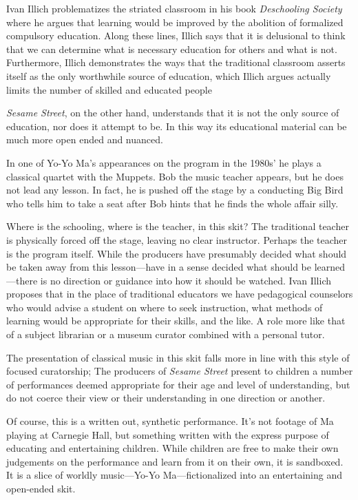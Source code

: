 \documentclass[12pt,letterpaper]{article}
\begin{document}
	Ivan Illich problematizes the striated classroom in his book
	\textit{Deschooling Society} where he argues
	that learning would be improved by the abolition of formalized
	compulsory education. Along these lines, Illich says that it is 
	delusional to think that we can determine what is necessary education 
	for others and what is not.\autocite[12]{Illich} Furthermore, Illich 
	demonstrates the ways that the traditional classroom asserts itself as
	the only worthwhile source of education, which Illich argues actually 
	limits the number of skilled and educated people\autocite[39]{Illich} 
		
	\textit{Sesame Street}, on the other hand, understands that it is not 
	the only source of education, nor does it attempt to be. In this way its
	educational material can be much more open ended and nuanced. 

	In one of Yo-Yo Ma's appearances on the program in the 1980s' he plays
	a classical quartet with the Muppets. Bob the music teacher appears, 
	but he does not lead any lesson. In fact, he is pushed off the stage by 
	a conducting Big Bird who tells him to take a seat after Bob hints that
	he finds the whole affair silly.

	Where is the schooling, where is the teacher, in this skit? The 
	traditional teacher is physically forced off the stage, leaving no clear
	instructor.  Perhaps the teacher is the program itself.  While the 
	producers have presumably decided what should be taken away from this 
	lesson---have in a sense decided what should be learned---there is no 
	direction or guidance into how it should be watched. Ivan Illich
	proposes that in the place of traditional educators we have
	pedagogical counselors who would advise a student on where to seek 
	instruction, what methods of learning would be appropriate for their 
	skills, and the like. A role more like that of a subject librarian or a 
	museum curator combined with a personal tutor.\autocite[43]{Illich}

	The presentation of classical music in this skit falls more in line with
	this style of focused curatorship; The producers of \textit{Sesame 
	Street} present to children a number of performances deemed appropriate
	for their age and level of understanding, but do not coerce their view 
	or their understanding in one direction or another.


	Of course, this is a written out, synthetic performance. It's not 
	footage of Ma playing at Carnegie Hall, but something written with the 
	express purpose of educating and entertaining children. While children 
	are free to make their own judgements on the performance and learn from
	it on their own, it is sandboxed. It is a slice of worldly music---Yo-Yo
	Ma---fictionalized into an entertaining and open-ended skit. 
\end{document}
